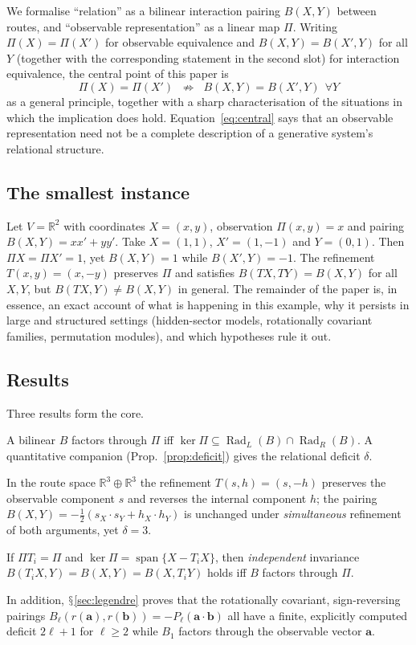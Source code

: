 \documentclass[11pt,a4paper]{article}
\renewcommand{\S}{\ensuremath{\mathsection}}
\newcommand{\RR}{\mathbb{R}}
\newcommand{\Rad}{\operatorname{Rad}}
\newcommand{\spn}{\operatorname{span}}
\newcommand{\defic}{\delta}
\theoremstyle{plain}
\theoremstyle{definition}
\begin{document}
We formalise ``relation'' as a bilinear interaction pairing $B(X,Y)$ between routes, and ``observable representation'' as a linear map $\Pi$.
Writing $\Pi(X)=\Pi(X')$ for observable equivalence and $B(X,Y)=B(X',Y)$ for all $Y$ (together with the corresponding statement in the second slot) for interaction equivalence, the central point of this paper is
\begin{equation}\label{eq:central}
\boxed{\;\Pi(X)=\Pi(X')\;\;\not\Rightarrow\;\; B(X,Y)=B(X',Y)\ \ \forall Y\;}
\end{equation}
as a general principle, together with a sharp characterisation of the situations in which the implication does hold.
Equation~\eqref{eq:central} says that an observable representation need not be a complete description of a generative system's relational structure.

\subsection{The smallest instance}\label{sec:smallest}
Let $V=\RR^2$ with coordinates $X=(x,y)$, observation $\Pi(x,y)=x$ and pairing $B(X,Y)=xx'+yy'$.
Take $X=(1,1)$, $X'=(1,-1)$ and $Y=(0,1)$.
Then $\Pi X=\Pi X'=1$, yet $B(X,Y)=1$ while $B(X',Y)=-1$.
The refinement $T(x,y)=(x,-y)$ preserves $\Pi$ and satisfies $B(TX,TY)=B(X,Y)$ for all $X,Y$, but $B(TX,Y)\neq B(X,Y)$ in general.
The remainder of the paper is, in essence, an exact account of what is happening in this example, why it persists in large and structured settings (hidden-sector models, rotationally covariant families, permutation modules), and which hypotheses rule it out.

\subsection{Results}
Three results form the core.
\begin{description}[leftmargin=0pt,style=unboxed,itemsep=3pt]
\item[Result I (Observable Quotient Criterion, Thm.~\ref{thm:quot}).] A bilinear $B$ factors through $\Pi$ iff $\ker\Pi\subseteq\Rad_L(B)\cap\Rad_R(B)$.
A quantitative companion (Prop.~\ref{prop:deficit}) gives the relational deficit $\defic$.
\item[Result II (Joint refinement invariance does not suffice, \S\ref{sec:joint}).]
In the route space $\RR^3\oplus\RR^3$ the refinement $T(s,h)=(s,-h)$ preserves the observable component $s$ and reverses the internal component $h$;
the pairing $B(X,Y)=-\tfrac12(s_X\!\cdot s_Y+h_X\!\cdot h_Y)$ is unchanged under \emph{simultaneous} refinement of both arguments, yet $\defic=3$.
\item[Result III (Refinement-Compatibility Theorem, Thm.~\ref{thm:compat}).]
If $\Pi T_i=\Pi$ and $\ker\Pi=\spn\{X-T_iX\}$, then \emph{independent} invariance $B(T_iX,Y)=B(X,Y)=B(X,T_iY)$ holds iff $B$ factors through $\Pi$.
\end{description}
In addition, \S\ref{sec:legendre} proves that the rotationally covariant, sign-reversing pairings $B_\ell(r(\mathbf a),r(\mathbf b))=-P_\ell(\mathbf a\cdot\mathbf b)$ all have a finite, explicitly computed deficit $2\ell+1$ for $\ell\ge 2$ while $B_1$ factors through the observable vector $\mathbf a$.
\end{document}

